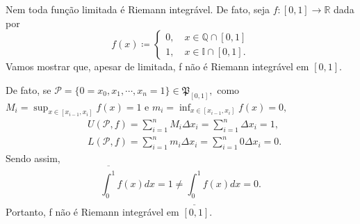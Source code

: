 \documentclass[analysis_notes.tex]{subfiles}
\begin{document}
\begin{example}
	Nem toda fun\c cão limitada é Riemann integrável. De fato, seja \(f:[0, 1]\rightarrow \mathbb{R}\) dada por
	\[
		f(x) \coloneqq  \left\{\begin{array}{ll}
			0,\quad x\in \mathbb{Q}\cap{[0, 1]} \\
			1,\quad x\in \mathbb{I}\cap{[0, 1]}.
		\end{array}\right.
	\]
	Vamos mostrar que, apesar de limitada, f não é Riemann integrável em \([0, 1].\)

	De fato, se \(\mathcal{P} = \{0 = x_{0}, x_{1}, \cdots, x_{n} = 1\}\in \mathfrak{P}_{[0, 1]},\) como \(M_{i}=\sup_{x\in[x_{i-1}, x_{i}]} f(x) = 1\)
	e \(m_{i} = \inf_{x\in[x_{i-1}, x_{i}]}f(x) = 0,\)
	\begin{align*}
		 & U(\mathcal{P}, f) = \sum\limits_{i=1}^{n}M_{i}\Delta x_{i} = \sum\limits_{i=1}^{n}\Delta x_{i} =1,   \\
		 & L(\mathcal{P}, f) = \sum\limits_{i=1}^{n}m_{i}\Delta x_{i} = \sum\limits_{i=1}^{n}0\Delta x_{i} = 0.
	\end{align*}
	Sendo assim,
	\[
		\overline{\int_{0}^{1}}f(x)dx = 1\neq \underline{\int_{0}^{1}}f(x)dx = 0.
	\]
	Portanto, f não é Riemann integrável em \([0, 1].\)
\end{example}
\end{document}
